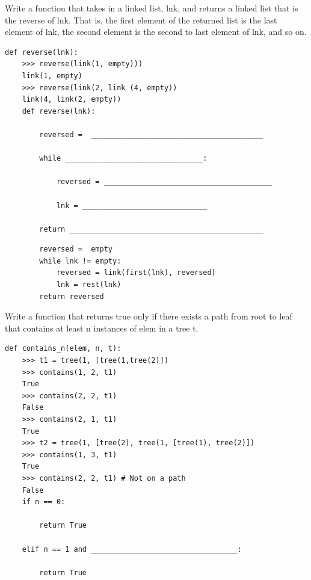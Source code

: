\documentclass{exam}
\begin{document}
\begin{questions}
\item Write a function that takes in a linked list, lnk, and returns a linked list that is the reverse of lnk. That is, the first element of the returned list is the last element of lnk, the second element is the second to last element of lnk, and so on.

\begin{lstlisting}
def reverse(lnk):
    >>> reverse(link(1, empty)))
    link(1, empty)
    >>> reverse(link(2, link (4, empty))
    link(4, link(2, empty))
    def reverse(lnk):
    
        reversed =  ________________________________________
        
        while ________________________________:
        
            reversed = _______________________________________
            
            lnk = _____________________________
            
        return _____________________________________________

\end{lstlisting}

\begin{solution}
\begin{lstlisting}
        reversed =  empty
        while lnk != empty:        
            reversed = link(first(lnk), reversed)            
            lnk = rest(lnk)            
        return reversed
\end{lstlisting}
\end{solution}

\clearpage

\item Write a function that returns true only if there exists a path from root to leaf that contains at least n instances of elem in a tree t.
\begin{lstlisting}
def contains_n(elem, n, t):
    >>> t1 = tree(1, [tree(1,tree(2)])
    >>> contains(1, 2, t1)
    True
    >>> contains(2, 2, t1)
    False
    >>> contains(2, 1, t1)
    True
    >>> t2 = tree(1, [tree(2), tree(1, [tree(1), tree(2)])
    >>> contains(1, 3, t1)
    True
    >>> contains(2, 2, t1) # Not on a path
    False
    if n == 0:
    
        return True
        
    elif n == 1 and __________________________________:
    
        return True
        

\end{lstlisting}
\end{questions}
\end{document}
